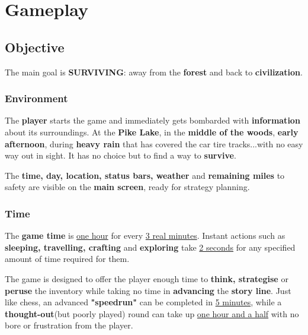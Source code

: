 \chapter{Gameplay} 

	\section{Objective}
		\par The main goal is \textbf{SURVIVING}: away from the \textbf{forest} and back to \textbf{civilization}.
		
		\subsection{Environment}
			\par The \textbf{player} starts the game and immediately gets bombarded with \textbf{information} about its surroundings. At the \textbf{Pike Lake}, in the \textbf{middle of the woods}, \textbf{early afternoon}, during \textbf{heavy rain} that has covered the car tire tracks...with no easy way out in sight. It has no choice but to find a way to \textbf{survive}. 
			\par The \textbf{time, day, location, status bars, weather} and \textbf{remaining miles} to safety are visible on the \textbf{main screen}, ready for strategy planning.
			
		\subsection{Time}
			\par The \textbf{game time} is \underline{one hour} for every \underline{3 real minutes}. Instant actions such as \textbf{sleeping, travelling, crafting} and \textbf{exploring} take \underline{2 seconds} for any specified amount of time required for them. 
			\par The game is designed to offer the player enough time to \textbf{think, strategise} or \textbf{peruse} the inventory while taking no time in \textbf{advancing} the \textbf{story line}. Just like chess, an advanced \textbf{"speedrun"} can be completed in \underline{5 minutes}, while a \textbf{thought-out}(but poorly played) round can take up \underline{one hour and a half} with no bore or frustration from the player.
		

